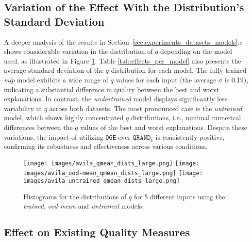 \subsection{Variation of the Effect With the Distribution's Standard Deviation}\label{sec:exploring-std}

A deeper analysis of the results in Section~\ref{sec:experiments_datasets_models}.c shows considerable variation in the distribution of $q$ depending on the model used, as illustrated in Figure \ref{fig:exhaustive_qmeans_hists}. Table \ref{tab:effects_per_model} also presents the average standard deviation of the $q$ distribution for each model. The fully-trained \textit{mlp} model exhibits a wide range of $q$ values for each input (the average $\sigma$ is 0.19), indicating a substantial difference in quality between the best and worst explanations. In contrast, the \textit{undertrained} model displays significantly less variability in $q$ across both datasets. The most pronounced case is the \textit{untrained} model, which shows highly concentrated $q$ distributions, i.e., minimal numerical differences between the $q$ values of the best and worst explanations. Despite these variations, the impact of utilizing \texttt{QGE} over $\texttt{QRAND}_1$ is consistently positive, confirming its robustness and effectiveness across various conditions.


\begin{figure}[htbp]
    \centering
    \texttt{[image: images/avila\_qmean\_dists\_large.png]}
    \texttt{[image: images/avila\_ood-mean\_qmean\_dists\_large.png]}
    \texttt{[image: images/avila\_untrained\_qmean\_dists\_large.png]}
    \caption{Histograms for the distributions of $q$ for 5 different inputs using the \textit{trained}, \textit{ood-mean} and \textit{untrained} models.}
    \label{fig:exhaustive_qmeans_hists}
\end{figure}

\subsection{Effect on Existing Quality Measures}\label{sec:effect-on-existing-appendix}


